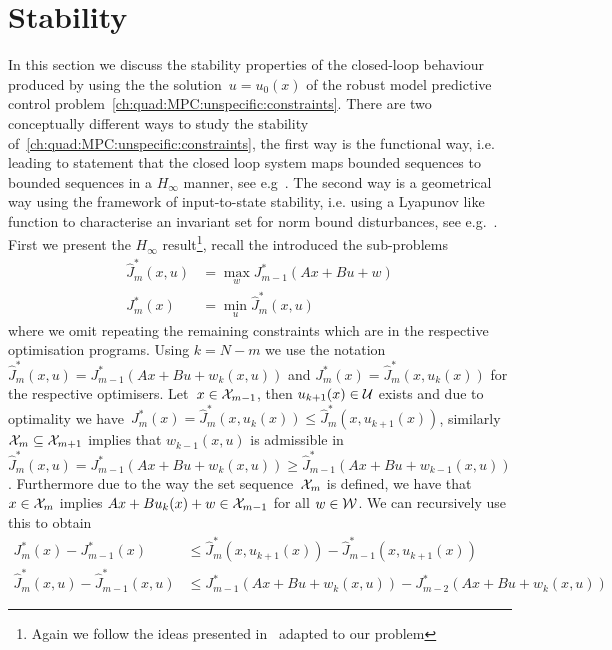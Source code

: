 \section{Stability}\label{ch:MPC:sec:qMPC:stability}
\resetforsection
%
%
%
%
%
In this section we discuss the stability properties of the closed-loop behaviour produced by using the the solution~$u=u_0(x)$ of the robust model predictive control problem~\eqref{ch:quad:MPC:unspecific:constraints}.
%
There are two conceptually different ways to study the stability of~\eqref{ch:quad:MPC:unspecific:constraints}, the first way is the functional way, i.e. leading to statement that the closed loop system maps bounded sequences to bounded sequences in a $H_\infty$ manner, see e.g~\cite{Mayne:2006}.
%
The second way is a geometrical way using the framework of input-to-state stability,  i.e. using a Lyapunov like function to characterise an invariant set for norm bound disturbances, see e.g.~\cite{Lazar:2008}.
%
\\[1em]
%
\mysplit First we present the $H_\infty$ result\footnote{
%
Again we follow the ideas presented in~\cite{Buerger:2016} adapted to our problem
}, recall the introduced the sub-problems
%
\[
\begin{aligned}
	\hat J_m^\ast(x,u) &= \max_w J_{m-1}^\ast(Ax+Bu+w)\\
	J_m^\ast(x) &= \min_u \hat J_m^\ast(x,u)
\end{aligned}
\]
%
where we omit repeating the remaining constraints which are in the respective optimisation programs.
%
Using $k = N-m$ we use the notation $\hat J_m^\ast(x,u) = J_{m-1}^\ast(Ax+Bu+w_{k}(x,u))$ and $J_m^\ast(x) = \hat J_m^\ast(x,u_k(x))$ for the respective optimisers.
%
Let~$x\in\mathcal X_{m-1}$, then $u_{k+1}(x)\in\mathcal U$ exists and due to optimality we have~$J_m^\ast(x) = \hat J_m^\ast(x,u_k(x))\leq \hat J_m^\ast(x,u_{k+1}(x))$, similarly $\mathcal X_m\subseteq\mathcal X_{m+1}$ implies that $w_{k-1}(x,u)$ is admissible in~$\hat J_m^\ast(x,u) = J_{m-1}^\ast(Ax+Bu+w_{k}(x,u))\geq\hat J_{m-1}^\ast(Ax+Bu+w_{k-1}(x,u))$.
%
Furthermore due to the way the set sequence~$\mathcal X_m$ is defined, we have that~$x\in\mathcal X_m$ implies $Ax+Bu_k(x)+w\in\mathcal X_{m-1}$ for all $w\in\mathcal W$.
%
We can recursively use this to obtain
%
\begin{equation}\begin{aligned}
	J_m^\ast(x)-J_{m-1}^\ast(x)&\leq\hat J_m^\ast(x,u_{k+1}(x))-\hat J_{m-1}^\ast(x,u_{k+1}(x))\\
	\hat J_m^\ast(x,u) - \hat J_{m-1}^\ast(x,u) &\leq J_{m-1}^\ast(Ax+Bu+w_k(x,u))-J_{m-2}^\ast(Ax+Bu+w_{k}(x,u))
\end{aligned}\end{equation}
